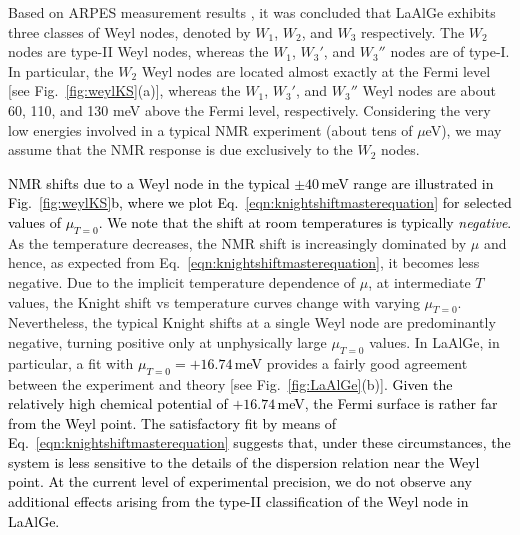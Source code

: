 \documentclass[aps,prb,a4paper,10pt,twocolumn,showpacs,floatfix,superscriptaddress,preprintnumbers,longbibliography]{revtex4-2}
\newcommand{\tcr}[1]{\textcolor{black}{#1}}
\begin{document}
Based on ARPES measurement results \cite{xue2017discovery}, it was
concluded that LaAlGe exhibits three classes of Weyl nodes, denoted by $W_1$, $W_2$, and 
$W_3$ respectively. The $W_2$ nodes are type-II Weyl nodes, whereas the 
$W_1$, $W_3'$, and $W_3''$ nodes are of type-I. %
In particular, the $W_2$ Weyl nodes are located almost exactly at the
Fermi level [see Fig.~\ref{fig:weylKS}(a)], whereas the $W_1$, $W_3'$, and $W_3''$ Weyl nodes are about 60, 110, and 130 meV above the Fermi level, respectively. Considering the very low energies involved in a typical NMR experiment 
(about tens of $\mu$eV), we may assume that the NMR response is due exclusively to the $W_2$ nodes. 

\tcr{NMR shifts due to a Weyl node in the typical $\pm 40$\,meV 
range are illustrated in Fig.~\ref{fig:weylKS}b, where we plot Eq.~\eqref{eqn:knightshiftmasterequation} 
for selected values of $\mu_{T=0}$. We note that the shift at room temperatures is typically  \emph{negative}.} As the temperature decreases, the NMR shift is increasingly dominated by $\mu$ and hence, as expected from Eq.~\eqref{eqn:knightshiftmasterequation}, 
it becomes less negative. 
Due to the implicit temperature dependence 
of $\mu$, at intermediate $T$ values, the Knight shift vs temperature curves 
change with varying $\mu_{T=0}$. Nevertheless, %
the typical Knight shifts at a single Weyl node are predominantly negative, 
turning positive only at unphysically large $\mu_{T=0}$ values. 
In LaAlGe, in particular, a fit with \tcr{$\mu_{T=0}=+16.74$\,meV} provides a fairly 
good agreement between the experiment and theory
[see Fig.~\ref{fig:LaAlGe}(b)]. 
\tcr{Given the relatively high chemical potential 
of $+16.74$\,meV, the Fermi surface is rather far from the Weyl 
point. The satisfactory fit by means of Eq.~\eqref{eqn:knightshiftmasterequation} 
suggests that, under these circumstances, the system is less sensitive to 
the details of the dispersion relation near the Weyl point. At the 
current level of experimental precision, we do not observe any additional 
effects arising from the type-II classification of the Weyl node in LaAlGe.}



%
\end{document}
